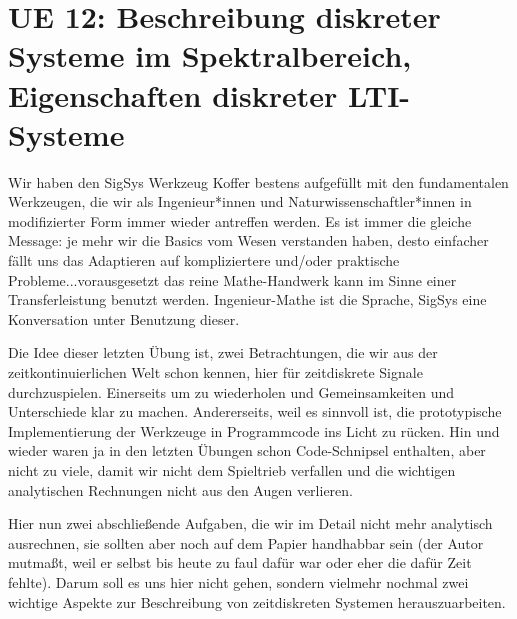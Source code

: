 \newpage
\section{UE 12: Beschreibung diskreter Systeme im Spektralbereich, Eigenschaften diskreter LTI-Systeme}

Wir haben den SigSys Werkzeug Koffer bestens aufgefüllt mit den fundamentalen
Werkzeugen, die wir als Ingenieur*innen und Naturwissenschaftler*innen
in modifizierter Form immer wieder antreffen werden.
Es ist immer die gleiche Message: je mehr wir
die Basics vom Wesen verstanden haben, desto einfacher fällt uns das Adaptieren auf
kompliziertere und/oder praktische Probleme...vorausgesetzt das reine Mathe-Handwerk kann im Sinne einer Transferleistung benutzt werden. Ingenieur-Mathe ist die Sprache, SigSys eine Konversation unter Benutzung dieser.

Die Idee dieser letzten Übung ist, zwei Betrachtungen, die wir aus der
zeitkontinuierlichen Welt schon kennen, hier für zeitdiskrete Signale
durchzuspielen. Einerseits um zu wiederholen und Gemeinsamkeiten und Unterschiede
klar zu machen. Andererseits, weil es sinnvoll ist,
die prototypische Implementierung der Werkzeuge in Programmcode
ins Licht zu rücken.
Hin und wieder waren ja in den letzten Übungen schon Code-Schnipsel
enthalten, aber nicht zu viele, damit wir nicht dem Spieltrieb verfallen und
die wichtigen analytischen Rechnungen nicht aus den Augen verlieren.

Hier nun zwei abschließende Aufgaben, die wir im Detail nicht mehr analytisch
ausrechnen, sie sollten aber noch auf dem Papier
handhabbar sein (der Autor mutmaßt, weil er selbst bis heute zu faul dafür war oder eher die dafür Zeit fehlte).
Darum soll es uns hier nicht gehen, sondern vielmehr nochmal zwei wichtige
Aspekte zur Beschreibung von zeitdiskreten Systemen herauszuarbeiten.





\clearpage

